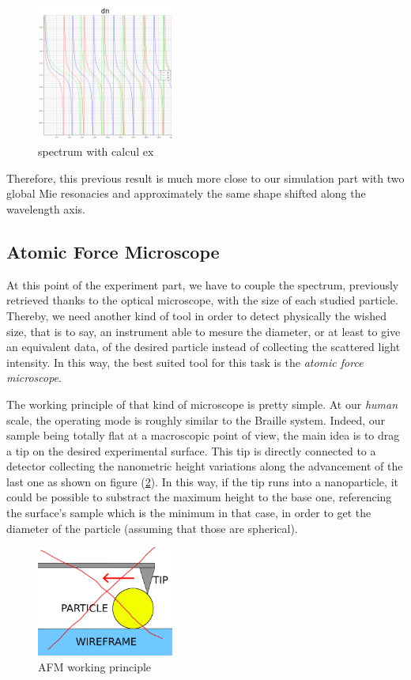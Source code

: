 \documentclass{article}
\numberwithin{equation}{section}
\begin{document}
\begin{figure}[h]
    \centering
    \includegraphics[width=0.4\textwidth, height=0.35\textwidth]{dn.png}
    \caption{spectrum with calcul ex}
    \label{fig:spectrum_w_calc_ex}
\end{figure}
Therefore, this previous result is much more close to our simulation part with two global Mie resonacies and approximately the same shape shifted along the wavelength axis.

\subsection{Atomic Force Microscope}

At this point of the experiment part, we have to couple the spectrum, previously retrieved thanks to the optical microscope, with the size of each studied particle. Thereby, we need another kind of tool in order to detect physically the wished size, that is to say, an instrument able to mesure the diameter, or at least to give an equivalent data, of the desired particle instead of collecting the scattered light intensity. In this way, the best suited tool for this task is the \textit{atomic force microscope}.

The working principle of that kind of microscope is pretty simple. At our \textit{human} scale, the operating mode is roughly similar to the Braille system. Indeed, our sample being totally flat at a macroscopic point of view, the main idea is to drag a tip on the desired experimental surface. This tip is directly connected to a detector collecting the nanometric height variations along the advancement of the last one as shown on figure (\ref{fig:afm_base}). In this way, if the tip runs into a nanoparticle, it could be possible to substract the maximum height to the base one, referencing the surface's sample which is the minimum in that case, in order to get the diameter of the particle (assuming that those are spherical).
\begin{figure}[h]
    \centering
    \includegraphics[width=0.4\textwidth, height=0.32\textwidth]{afm_base.png}
    \caption{AFM working principle}
    \label{fig:afm_base}
\end{figure}
\end{document}
